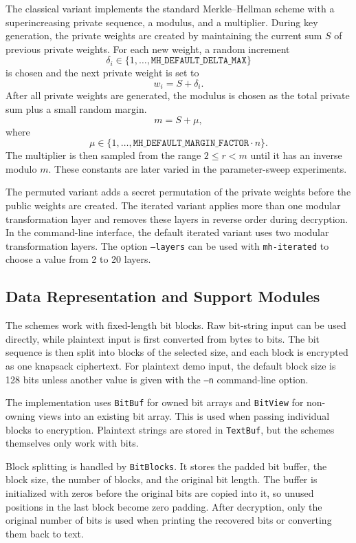 The classical variant implements the standard Merkle--Hellman scheme with a
superincreasing private sequence, a modulus, and a multiplier. During key
generation, the private weights are created by maintaining the current sum
\(S\) of previous private weights. For each new weight, a random increment
\[
    \delta_i \in \{1,\dots,\texttt{MH\_DEFAULT\_DELTA\_MAX}\}
\]
is chosen and the next private weight is set to
\[
    w_i = S + \delta_i.
\]
After all private weights are generated, the modulus is chosen as the total
private sum plus a small random margin.
\[
    m = S + \mu,
\]
where
\[
    \mu \in \{1,\dots,\texttt{MH\_DEFAULT\_MARGIN\_FACTOR}\cdot n\}.
\]
The multiplier is then sampled from the range \(2 \le r < m\) until it has
an inverse modulo \(m\). These constants are later varied in the
parameter-sweep experiments.

The permuted variant adds a secret permutation of the private weights before
the public weights are created. The iterated variant applies more than one
modular transformation layer and removes these layers in reverse order during
decryption. In the command-line interface, the default iterated variant uses two
modular transformation layers. The option \texttt{--layers} can be used with
\texttt{mh-iterated} to choose a value from 2 to 20 layers.

\subsection{Data Representation and Support Modules}

The schemes work with fixed-length bit blocks. Raw bit-string input can be used
directly, while plaintext input is first converted from bytes to bits. The bit
sequence is then split into blocks of the selected size, and each block is
encrypted as one knapsack ciphertext. For plaintext demo input, the default
block size is 128 bits unless another value is given with the \texttt{--n}
command-line option.

The implementation uses \texttt{BitBuf} for owned bit arrays and
\texttt{BitView} for non-owning views into an existing bit array. This is used
when passing individual blocks to encryption. Plaintext strings are stored in
\texttt{TextBuf}, but the schemes themselves only work with bits.

Block splitting is handled by \texttt{BitBlocks}. It stores the padded bit
buffer, the block size, the number of blocks, and the original bit length. The
buffer is initialized with zeros before the original bits are copied into it, so
unused positions in the last block become zero padding. After decryption, only
the original number of bits is used when printing the recovered bits or
converting them back to text.

